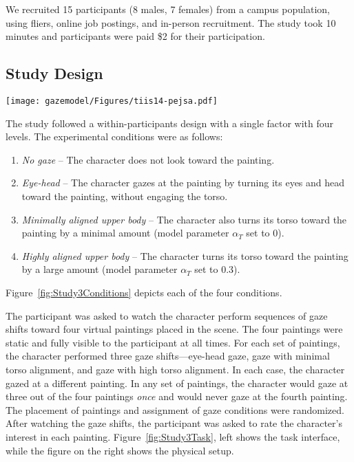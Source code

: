 We recruited 15 participants (8 males, 7 females) from a campus population, using fliers, online job postings, and in-person recruitment. The study took 10 minutes and participants were paid \$2 for their participation.

\subsection{Study Design}

\begin{figure*}
\centering
\texttt{[image: gazemodel/Figures/tiis14-pejsa.pdf]}
\caption{Experimental conditions in Study 3.}
\label{fig:Study3Conditions}
\end{figure*}

The study followed a within-participants design with a single factor with four levels. The experimental conditions were as follows:

\begin{enumerate}
\item \emph{No gaze} -- The character does not look toward the painting.
\item \emph{Eye-head} -- The character gazes at the painting by turning its eyes and head toward the painting, without engaging the torso.
\item \emph{Minimally aligned upper body} -- The character also turns its torso toward the painting by a minimal amount (model parameter $\alpha_T$ set to 0).
\item \emph{Highly aligned upper body} -- The character turns its torso toward the painting by a large amount (model parameter $\alpha_T$ set to 0.3).
\end{enumerate}

Figure~\ref{fig:Study3Conditions} depicts each of the four conditions.

The participant was asked to watch the character perform sequences of gaze shifts toward four virtual paintings placed in the scene. The four paintings were static and fully visible to the participant at all times. For each set of paintings, the character performed three gaze shifts---eye-head gaze, gaze with minimal torso alignment, and gaze with high torso alignment. In each case, the character gazed at a different painting. In any set of paintings, the character would gaze at three out of the four paintings \emph{once} and would never gaze at the fourth painting. The placement of paintings and assignment of gaze conditions were randomized. After watching the gaze shifts, the participant was asked to rate the character's interest in each painting. Figure~\ref{fig:Study3Task}, left shows the task interface, while the figure on the right shows the physical setup.

